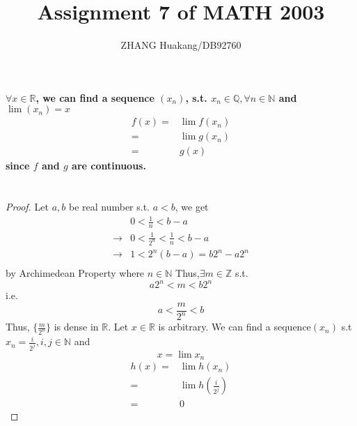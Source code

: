 \documentclass{article}
\title{Assignment 7 of MATH 2003}
\author{ZHANG Huakang/DB92760}
\begin{document}
    \maketitle

    \section{}
        \paragraph{
            $\forall x\in \mathbb{R}$, we can find a sequence $(x_n)$, s.t. $x_n\in \mathbb{Q},\forall n\in\mathbb{N}$ and $\lim (x_n)=x$
            \begin{equation*}
                \begin{split}
                    f(x)=&\lim f(x_n)\\
                        =&\lim g(x_n)\\
                        =&g(x)
                \end{split}
            \end{equation*}
            since $f$ and $g$ are continuous.
        }
    
    \section{}
        \begin{proof}
            Let $a,b$ be real number s.t. $a<b$, we get
            \begin{equation*}
                \begin{split}
                    &0<\frac{1}{n}<b-a\\
                    \rightarrow&0<\frac{1}{2^n}<\frac{1}{n}<b-a\\
                    \rightarrow&1<2^n(b-a)=b2^n-a2^n\\
                \end{split}
            \end{equation*}
            by Archimedean Property where $n\in\mathbb{N}$
            Thus,$\exists m\in \mathbb{Z}$ s.t.
            $$a2^n<m<b2^n$$
            i.e.
            $$a<\frac{m}{2^n}<b$$
            Thus, $\{\frac{m}{2^n}\}$ is dense in $\mathbb{R}$.
            Let $x\in \mathbb{R}$ is arbitrary. We can find a sequence$(x_n)$ s.t
            $x_n=\frac{i}{2^j},i,j\in \mathbb{N}$ and $$x=\lim x_n$$ 
            \begin{equation*}
                \begin{split}
                    h(x)=&\lim h(x_n)\\
                        =&\lim h(\frac{i}{2^j})\\
                        =&0
                \end{split}
            \end{equation*}
        \end{proof}
\end{document}
